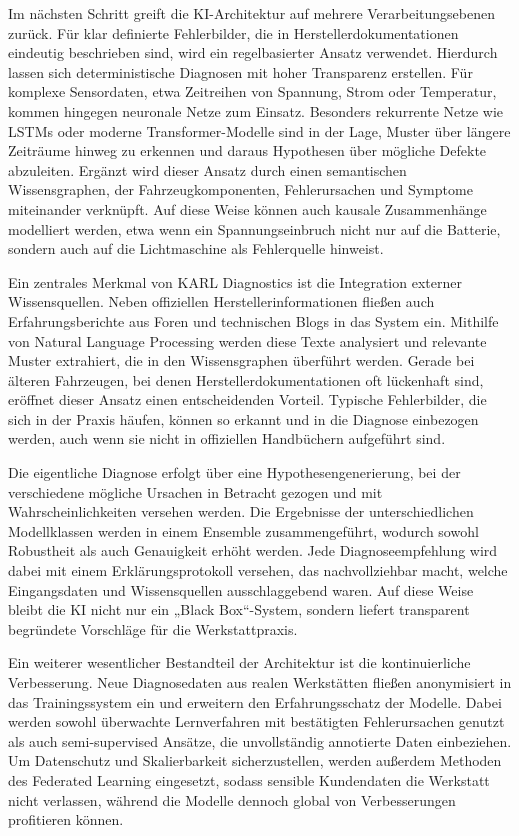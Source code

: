 Im nächsten Schritt greift die \ac{KI}-Architektur auf mehrere Verarbeitungsebenen zurück. Für klar definierte Fehlerbilder, die in Herstellerdokumentationen eindeutig beschrieben sind, wird ein regelbasierter Ansatz verwendet. Hierdurch lassen sich deterministische Diagnosen mit hoher Transparenz erstellen. Für komplexe Sensordaten, etwa Zeitreihen von Spannung, Strom oder Temperatur, kommen hingegen neuronale Netze zum Einsatz. Besonders rekurrente Netze wie LSTMs oder moderne Transformer-Modelle sind in der Lage, Muster über längere Zeiträume hinweg zu erkennen und daraus Hypothesen über mögliche Defekte abzuleiten. Ergänzt wird dieser Ansatz durch einen semantischen Wissensgraphen, der Fahrzeugkomponenten, Fehlerursachen und Symptome miteinander verknüpft. Auf diese Weise können auch kausale Zusammenhänge modelliert werden, etwa wenn ein Spannungseinbruch nicht nur auf die Batterie, sondern auch auf die Lichtmaschine als Fehlerquelle hinweist.

Ein zentrales Merkmal von KARL Diagnostics ist die Integration externer Wissensquellen. Neben offiziellen Herstellerinformationen fließen auch Erfahrungsberichte aus Foren und technischen Blogs in das System ein. Mithilfe von Natural Language Processing werden diese Texte analysiert und relevante Muster extrahiert, die in den Wissensgraphen überführt werden. Gerade bei älteren Fahrzeugen, bei denen Herstellerdokumentationen oft lückenhaft sind, eröffnet dieser Ansatz einen entscheidenden Vorteil. Typische Fehlerbilder, die sich in der Praxis häufen, können so erkannt und in die Diagnose einbezogen werden, auch wenn sie nicht in offiziellen Handbüchern aufgeführt sind.

Die eigentliche Diagnose erfolgt über eine Hypothesengenerierung, bei der verschiedene mögliche Ursachen in Betracht gezogen und mit Wahrscheinlichkeiten versehen werden. Die Ergebnisse der unterschiedlichen Modellklassen werden in einem Ensemble zusammengeführt, wodurch sowohl Robustheit als auch Genauigkeit erhöht werden. Jede Diagnoseempfehlung wird dabei mit einem Erklärungsprotokoll versehen, das nachvollziehbar macht, welche Eingangsdaten und Wissensquellen ausschlaggebend waren. Auf diese Weise bleibt die KI nicht nur ein „Black Box“-System, sondern liefert transparent begründete Vorschläge für die Werkstattpraxis. 

Ein weiterer wesentlicher Bestandteil der Architektur ist die kontinuierliche Verbesserung. Neue Diagnosedaten aus realen Werkstätten fließen anonymisiert in das Trainingssystem ein und erweitern den Erfahrungsschatz der Modelle. Dabei werden sowohl überwachte Lernverfahren mit bestätigten Fehlerursachen genutzt als auch semi-supervised Ansätze, die unvollständig annotierte Daten einbeziehen. Um Datenschutz und Skalierbarkeit sicherzustellen, werden außerdem Methoden des Federated Learning eingesetzt, sodass sensible Kundendaten die Werkstatt nicht verlassen, während die Modelle dennoch global von Verbesserungen profitieren können.

